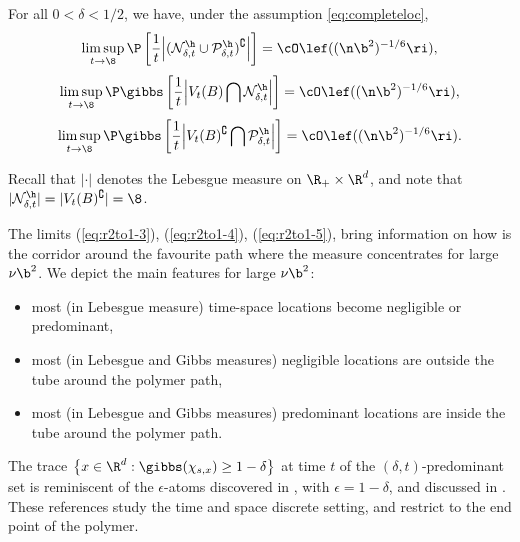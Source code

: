 \begin{corollary}\label{th:pathlocfull2}
For all $0<\delta <1/2$, we have, under the assumption \eqref{eq:completeloc},  
\begin{equation}
\label{eq:r2to1-3}
\limsup_{t\to\8}\P \left[ \frac{1}{t}  \Big\vert  ({\cal N}_{\delta,t}^\h \cup  {\cal P}_{\delta,t}^\h)^\complement
 \Big\vert  \right]
=\cO \lef( (\n \b^2)^{-1/6}\ri),
\end{equation}
\begin{equation}
\label{eq:r2to1-4}
\limsup_{t\to\8}\P \gibbs \left[ \frac{1}{t}  \Big\vert  V_t(B) \bigcap {\cal N}_{\delta,t}^\h
\Big\vert 
\right]
=\cO \lef( (\n \b^2)^{-1/6}\ri),
\end{equation}
\begin{equation}
\label{eq:r2to1-5}
\limsup_{t\to\8}\P \gibbs \left[ \frac{1}{t}  \Big\vert  
V_t(B)^\complement   \bigcap 
{\cal P}_{\delta,t}^\h
  \Big\vert  
\right]
=\cO \lef( (\n \b^2)^{-1/6}\ri).
\end{equation}
\end{corollary}
Recall that $\vert \cdot \vert$ denotes the Lebesgue measure on $\R_+ \times \R^d$, and  note that 
$ \vert  {\cal N}_{\delta,t}^\h  \vert =  \vert  V_t(B)^\complement  \vert = \8$.

The limits (\ref{eq:r2to1-3}),  (\ref{eq:r2to1-4}),  (\ref{eq:r2to1-5}), bring %
information on how is the corridor around the favourite path where the measure concentrates for large $\nu \b^2$.
We depict the main features  for large $\nu \b^2$:
\begin{itemize}
\item
 most (in Lebesgue measure) time-space  locations become negligible or predominant, 
\item most  (in Lebesgue and Gibbs measures)  negligible  locations are outside the tube around the polymer path, 
\item
 most  (in Lebesgue and Gibbs measures)  predominant  locations are inside the tube around the polymer path.
\end{itemize}
The trace $ \big\{x \in \R^d: \gibbs(\chi_{s,x}) \geq 1-\delta\big\}$ at time $t$ of the $(\delta,t)$-predominant set is reminiscent of the $\epsilon$-atoms discovered  in \cite{VargasAtoms07}, with $\epsilon=1-\delta$, and discussed in \cite{BatesChatterjee}. These references study 
the time and space discrete setting, and restrict to the end point of the polymer.

